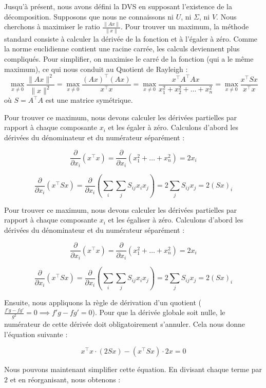 \documentclass[12pt]{report}
\begin{document}
\noindent Jusqu'à présent, nous avons défini la DVS en supposant l'existence de la décomposition. Supposons que nous ne connaissons ni $U$, ni $\Sigma$, ni $V$.
Nous cherchons à maximiser le ratio $\frac{\|Ax\|}{\|x\|}$. Pour trouver un maximum, la méthode standard consiste à calculer la dérivée de la fonction et à l'égaler à zéro. Comme la norme euclidienne contient une racine carrée, les calculs deviennent plus compliqués. Pour simplifier, on maximise le carré de la fonction (qui a le même maximum), ce qui nous conduit au {Quotient de Rayleigh} :
\begin{equation}
    \max_{x \neq 0} \frac{\|Ax\|^2}{\|x\|^2} = \max_{x \neq 0} \frac{(Ax)^{\top} (Ax)}{x^{\top} x} = \max_{x \neq 0} \frac{x^{\top} A^{\top} A x}{x_1^2 + x_2^2 + \dots + x_n^2} = \max_{x \neq 0} \frac{x^{\top} S x}{x^{\top} x}
\end{equation}
où $S = A^{\top} A$ est une matrice symétrique.

Pour trouver ce maximum, nous devons calculer les dérivées partielles par rapport à chaque composante $x_i$ et les égaler à zéro. Calculons d'abord les dérivées du dénominateur et du numérateur séparément :

$$\frac{\partial}{\partial x_i} (x^{\top} x) = \frac{\partial}{\partial x_i} (x_1^2 + \dots + x_n^2) = 2x_i$$

$$\frac{\partial}{\partial x_i} (x^{\top} S x) = \frac{\partial}{\partial x_i} \left( \sum_i \sum_j S_{ij} x_i x_j \right) = 2 \sum_j S_{ij} x_j = 2(Sx)_i$$

\noindent Pour trouver ce maximum, nous devons calculer les dérivées partielles par rapport à chaque composante $x_i$ et les égaliser à zéro. Calculons d'abord les dérivées du dénominateur et du numérateur séparément :

$$\frac{\partial}{\partial x_i} (x^{\top} x) = \frac{\partial}{\partial x_i} (x_1^2 + \dots + x_n^2) = 2x_i$$

$$\frac{\partial}{\partial x_i} (x^{\top} S x) = \frac{\partial}{\partial x_i} \left( \sum_i \sum_j S_{ij} x_i x_j \right) = 2 \sum_j S_{ij} x_j = 2(Sx)_i$$

\noindent Ensuite, nous appliquons la règle de dérivation d'un quotient ($\frac{f'g - fg'}{g^2} = 0 \implies f'g - fg' = 0$). Pour que la dérivée globale soit nulle, le numérateur de cette dérivée doit obligatoirement s'annuler. Cela nous donne l'équation suivante :

$$x^{\top} x \cdot (2Sx) - (x^{\top} Sx) \cdot 2x = 0$$

\noindent Nous pouvons maintenant simplifier cette équation. En divisant chaque terme par $2$ et en réorganisant, nous obtenons :
\end{document}

